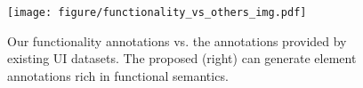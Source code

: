 \begin{figure}[t]
    \centering
    \texttt{[image: figure/functionality\_vs\_others\_img.pdf]}
    \caption{Our functionality annotations vs. the annotations provided by existing UI datasets. The proposed \methodname{} (right) can generate element annotations rich in functional semantics.}
    \label{fig: functionality vs others}
\end{figure}